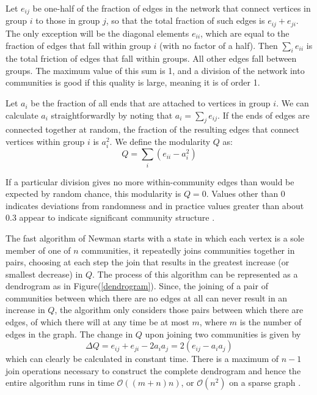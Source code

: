 {Let $e_{ij}$ be one-half of the fraction of edges in the network that connect vertices in group $i$ to those in group $j$, so that the total fraction of such edges is $e_{ij} + e_{ji}$. The only exception will be the diagonal elements $e_{ii}$, which are equal to the fraction of edges that fall within group $i$ (with no factor of a half). Then $\sum_i e_{ii}$ is the total friction of edges that fall within groups. All other edges fall between groups. The maximum value of this sum is 1, and  a division of the network into communities is good if this quality is large, meaning it is of order 1.

Let $a_i$ be the fraction of all ends that are attached to vertices in group $i$. We can calculate $a_i$ straightforwardly by noting that $a_i = \sum_j e_{ij}$. If the ends of edges are connected together at random, the fraction of the resulting edges that connect vertices within group $i$ is $a_i^2$. We define the modularity $Q$ as:
\begin{equation}
Q = \sum\limits_i (e_{ii} - a_i^2)
\end{equation}

If a particular division gives no more within-community edges than would be expected by random chance, this modularity is $Q = 0$. Values other than 0 indicates deviations from randomness and in practice values greater than about 0.3 appear to indicate significant community structure \cite{ref-12}.

The fast algorithm of Newman starts with a state in which each vertex is a sole member of one of $n$ communities, it repeatedly joins communities together in pairs, choosing at each step the  join that results in the greatest increase (or smallest decrease) in $Q$. The process of this algorithm can be represented as a dendrogram as in Figure(\ref{dendrogram}). Since, the joining of a pair of communities between which there are no edges at all can never result in an increase in $Q$, the algorithm only considers those pairs between which there are edges, of which there will at any time be at most $m$, where $m$ is the number of edges in the graph. The change in $Q$ upon joining two communities is given by
\begin{equation}
\Delta Q = e_{ij} + e_{ji} - 2 a_i a_j = 2(e_{ij} - a_ia_j)
\end{equation}
which can clearly be calculated in constant time. There is a maximum of $n - 1$ join operations necessary to construct the complete dendrogram and hence the entire algorithm runs in time $\mathcal{O}((m + n)n)$, or $\mathcal{O}(n^2)$ on a sparse graph \cite{ref-13}.

}
